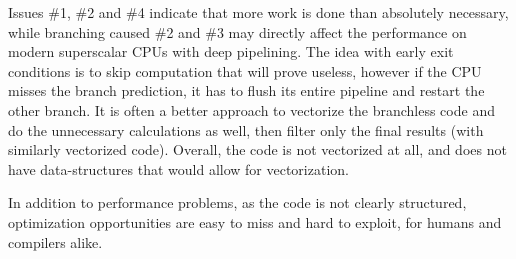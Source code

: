 \documentclass[12pt]{article}
\begin{document}
Issues \#1, \#2 and \#4 indicate that more work is done than absolutely necessary, while branching caused \#2 and \#3 may directly affect the performance on modern superscalar CPUs with deep pipelining. The idea with early exit conditions is to skip computation that will prove useless, however if the CPU misses the branch prediction, it has to flush its entire pipeline and restart the other branch. It is often a better approach to vectorize the branchless code and do the unnecessary calculations as well, then filter only the final results (with similarly vectorized code). Overall, the code is not vectorized at all, and does not have data-structures that would allow for vectorization.

In addition to performance problems, as the code is not clearly structured, optimization opportunities are easy to miss and hard to exploit, for humans and compilers alike.
\end{document}
